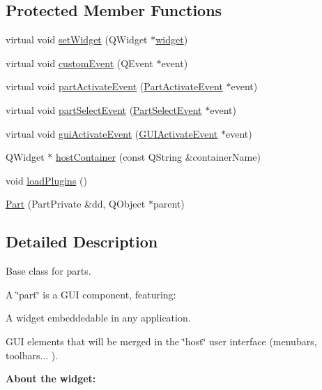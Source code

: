 \subsection*{\-Protected \-Member \-Functions}
\begin{DoxyCompactItemize}
\item 
virtual void \hyperlink{classKParts_1_1Part_a7578836b79ed97019b42f2d2fc03082d}{set\-Widget} (\-Q\-Widget $\ast$\hyperlink{classKParts_1_1Part_a134900cb0605a1cd5113d90954a01fdf}{widget})
\item 
virtual void \hyperlink{classKParts_1_1Part_a06a8a01b69df2ab366c5c5453b9194bd}{custom\-Event} (\-Q\-Event $\ast$event)
\item 
virtual void \hyperlink{classKParts_1_1Part_ad848641dbb38a3b2404b2ad554a08fba}{part\-Activate\-Event} (\hyperlink{classKParts_1_1PartActivateEvent}{\-Part\-Activate\-Event} $\ast$event)
\item 
virtual void \hyperlink{classKParts_1_1Part_a71a55af4b780e14d9ccadddfe7868941}{part\-Select\-Event} (\hyperlink{classKParts_1_1PartSelectEvent}{\-Part\-Select\-Event} $\ast$event)
\item 
virtual void \hyperlink{classKParts_1_1Part_a34b92f00459085ca7e05b7e8ee321347}{gui\-Activate\-Event} (\hyperlink{classKParts_1_1GUIActivateEvent}{\-G\-U\-I\-Activate\-Event} $\ast$event)
\item 
\-Q\-Widget $\ast$ \hyperlink{classKParts_1_1Part_a42ca0149d66ab5f2eea3d22b96300af0}{host\-Container} (const \-Q\-String \&container\-Name)
\item 
void \hyperlink{classKParts_1_1Part_aff25cf37e0d4e205028d75dee120828c}{load\-Plugins} ()
\item 
\hyperlink{classKParts_1_1Part_aa6c6292dcf062b5f4d711e6ab90070c9}{\-Part} (\-Part\-Private \&dd, \-Q\-Object $\ast$parent)
\end{DoxyCompactItemize}


\subsection{\-Detailed \-Description}
\-Base class for parts.

\-A \char`\"{}part\char`\"{} is a \-G\-U\-I component, featuring\-: \begin{DoxyItemize}
\item \-A widget embeddedable in any application. \item \-G\-U\-I elements that will be merged in the \char`\"{}host\char`\"{} user interface (menubars, toolbars... ).\end{DoxyItemize}
{\bfseries \-About the widget\-:}\par


